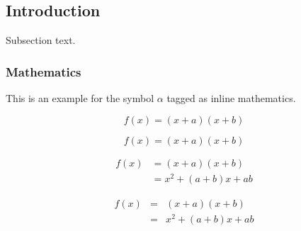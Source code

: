 \documentclass[final,5p,times]{elsarticle}
\begin{document}
\subsection{Introduction}

\label{subsec1}

Subsection text.


\subsubsection{Mathematics}
This is an example for the symbol $\alpha$ tagged as inline mathematics.

\begin{equation}
f(x) = (x+a)(x+b)
\end{equation}

\begin{equation*}
f(x) = (x+a)(x+b)
\end{equation*}

\begin{align}
 f(x) &= (x+a)(x+b) \\
      &= x^2 + (a+b)x + ab
\end{align}

\begin{eqnarray}
 f(x) &=& (x+a)(x+b) \nonumber\\ %
      &=& x^2 + (a+b)x + ab
\end{eqnarray}
\end{document}
